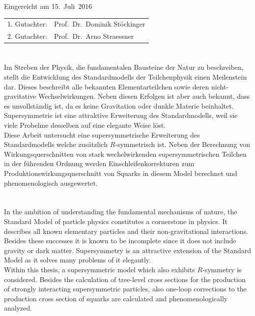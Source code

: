 \thispagestyle{empty}\vspace*{48em}
Eingereicht am 15.~Juli~2016\vspace{1.5em}
\par{\large\begin{tabular}{ll}
 1. Gutachter: & Prof.~Dr.~Dominik Stöckinger \\
 2. Gutachter: & Prof.~Dr.~Arno Straessner \\
\end{tabular}}
\newpage

\thispagestyle{empty}
\cleardoublepage

\section*{}
Im Streben der Physik, die fundamentalen Bausteine der Natur zu beschreiben, stellt die Ent\-wicklung des Standardmodells der Teilchenphysik einen Meilenstein dar. Dieses beschreibt alle bekannten Elementarteilchen sowie deren nicht-gravitative Wechselwirkungen. Neben diesen Erfolgen ist aber auch bekannt, dass es unvollständig ist, da es keine Gravitation oder dunkle Materie beinhaltet. Supersymmetrie ist eine attraktive Erweiterung des Standardmodells, weil sie viele Probelme desselben auf eine elegante Weise löst.\\
Diese Arbeit untersucht eine supersymmetrische Erweiterung des Standardmodells welche zusätzlich $R$-symmetrisch ist. Neben der Berechnung von Wirkungsquerschnitten von stark wechelwirkenden supersymmetrischen Teilchen in der führenden Ordnung werden Einschleifen\-korrekturen zum Produktionswirkungsquerschnitt von Squarks in diesem Model berechnet und phenomenologisch ausgewertet.
\vspace{10em}
\section*{}
In the ambition of understanding the fundamental mechanisms of nature, the Standard Model of particle physics constitutes a cornerstone in physics. It describes all known elementary particles and their non-gravitational interactions. Besides these successes it is known to be incomplete since it does not include gravity or dark matter. Supersymmetry is an attractive extension of the Standard Model as it solves many problems of it elegantly.\\
Within this thesis, a supersymmetric model which also exhibits $R$-symmetry is considered. Besides the calculation of tree-level cross sections for the production of strongly interacting supersymmetric particles, also one-loop corrections to the production cross section of squarks are calculated and phenomenologically analyzed.
\newpage

